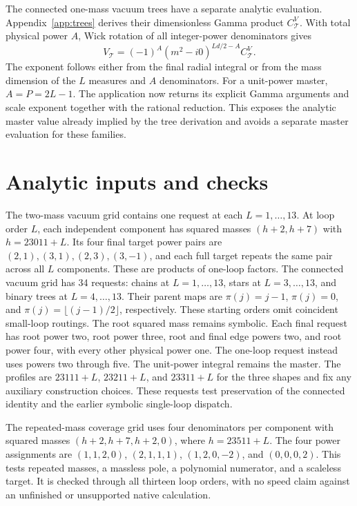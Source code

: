 The connected one-mass vacuum trees have a separate analytic evaluation. Appendix~\ref{app:trees} derives their dimensionless Gamma product $C^V_{\mathcal T}$. With total physical power $A$, Wick rotation of all integer-power denominators gives
\begin{equation}
 V_{\mathcal T}=(-1)^A(m^2-i0)^{Ld/2-A}C^V_{\mathcal T}.
 \label{eq:direct-tree-value}
\end{equation}
The exponent follows either from the final radial integral or from the mass dimension of the $L$ measures and $A$ denominators. For a unit-power master, $A=P=2L-1$. The application now returns its explicit Gamma arguments and scale exponent together with the rational reduction. This exposes the analytic master value already implied by the tree derivation and avoids a separate master evaluation for these families.

\section{Analytic inputs and checks}
\label{app:direct-inputs}
The two-mass vacuum grid contains one request at each $L=1,\ldots,13$. At loop order $L$, each independent component has squared masses $(h+2,h+7)$ with $h=23011+L$. Its four final target power pairs are $(2,1),(3,1),(2,3),(3,-1)$, and each full target repeats the same pair across all $L$ components. These are products of one-loop factors. The connected vacuum grid has 34 requests: chains at $L=1,\ldots,13$, stars at $L=3,\ldots,13$, and binary trees at $L=4,\ldots,13$. Their parent maps are $\pi(j)=j-1$, $\pi(j)=0$, and $\pi(j)=\lfloor(j-1)/2\rfloor$, respectively. These starting orders omit coincident small-loop routings. The root squared mass remains symbolic. Each final request has root power two, root power three, root and final edge powers two, and root power four, with every other physical power one. The one-loop request instead uses powers two through five. The unit-power integral remains the master. The profiles are $23111+L$, $23211+L$, and $23311+L$ for the three shapes and fix any auxiliary construction choices. These requests test preservation of the connected identity and the earlier symbolic single-loop dispatch.

The repeated-mass coverage grid uses four denominators per component with squared masses $(h+2,h+7,h+2,0)$, where $h=23511+L$. The four power assignments are $(1,1,2,0)$, $(2,1,1,1)$, $(1,2,0,-2)$, and $(0,0,0,2)$. This tests repeated masses, a massless pole, a polynomial numerator, and a scaleless target. It is checked through all thirteen loop orders, with no speed claim against an unfinished or unsupported native calculation.

